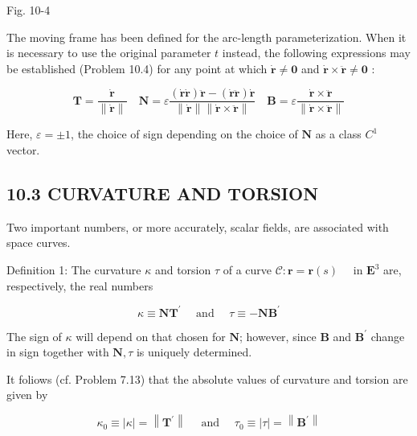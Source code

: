 \documentclass[10pt]{article}
\begin{document}
Fig. 10-4

The moving frame has been defined for the arc-length parameterization. When it is necessary to use the original parameter $t$ instead, the following expressions may be established (Problem 10.4) for any point at which $\dot{\mathbf{r}} \neq \mathbf{0}$ and $\dot{\mathbf{r}} \times \ddot{\mathbf{r}} \neq \mathbf{0}$ :


\begin{equation*}
\mathbf{T}=\frac{\dot{\mathbf{r}}}{\|\dot{\mathbf{r}}\|} \quad \mathbf{N}=\varepsilon \frac{(\dot{\mathbf{r}} \dot{\mathbf{r}}) \ddot{\mathbf{r}}-(\dot{\mathbf{r}} \ddot{\mathbf{r}}) \dot{\mathbf{r}}}{\|\dot{\mathbf{r}}\|\|\dot{\mathbf{r}} \times \ddot{\mathbf{r}}\|} \quad \mathbf{B}=\varepsilon \frac{\dot{\mathbf{r}} \times \ddot{\mathbf{r}}}{\|\dot{\mathbf{r}} \times \ddot{\mathbf{r}}\|} \tag{10.5}
\end{equation*}


Here, $\varepsilon= \pm 1$, the choice of sign depending on the choice of $\mathbf{N}$ as a class $C^{1}$ vector.

\subsection*{10.3 CURVATURE AND TORSION}
Two important numbers, or more accurately, scalar fields, are associated with space curves.

Definition 1: The curvature $\kappa$ and torsion $\tau$ of a curve $\mathscr{C}: \mathbf{r}=\mathbf{r}(s) \quad$ in $\mathbf{E}^{3}$ are, respectively, the real numbers


\begin{equation*}
\kappa \equiv \mathbf{N T}^{\prime} \quad \text { and } \quad \tau \equiv-\mathbf{N B}^{\prime} \tag{10.6}
\end{equation*}


The sign of $\kappa$ will depend on that chosen for $\mathbf{N}$; however, since $\mathbf{B}$ and $\mathbf{B}^{\prime}$ change in sign together with $\mathbf{N}, \tau$ is uniquely determined.

It foliows (cf. Problem 7.13) that the absolute values of curvature and torsion are given by


\begin{equation*}
\kappa_{0} \equiv|\kappa|=\left\|\mathbf{T}^{\prime}\right\| \quad \text { and } \quad \tau_{0} \equiv|\tau|=\left\|\mathbf{B}^{\prime}\right\| \tag{10.7}
\end{equation*}
\end{document}
